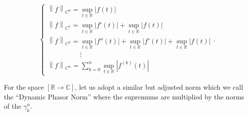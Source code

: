 \begin{equation} \left\{\begin{array}{l} \left\lVert f\right\rVert_{C^0} = \sup\limits_{t\in\mathbb{R}} \left\lvert f(t)\right\rvert \\[3mm] \left\lVert f\right\rVert_{C^1} = \sup\limits_{t\in\mathbb{R}} \left\lvert f'(t)\right\rvert + \sup\limits_{t\in\mathbb{R}} \left\lvert f(t)\right\rvert \\[3mm] \left\lVert f\right\rVert_{C^2} = \sup\limits_{t\in\mathbb{R}} \left\lvert f''(t)\right\rvert + \sup\limits_{t\in\mathbb{R}} \left\lvert f'(t)\right\rvert + \sup\limits_{t\in\mathbb{R}} \left\lvert f(t)\right\rvert  \\[3mm] \hspace{2cm} \vdots \\[3mm] \displaystyle\left\lVert f\right\rVert_{C^n} = \sum_{k=0}^n \sup\limits_{t\in\mathbb{R}} \left\lvert f^{(k)}(t)\right\rvert \end{array}\right. . \label{eq:usual_norm_cn}\end{equation}

	For the space $\left[\mathbb{R}\to\mathbb{C}\right]$, let us adopt a similar but adjusted norm which we call the ``Dynamic Phasor Norm'' where the supremums are multiplied by the norms of the $\gamma_k^n$.

